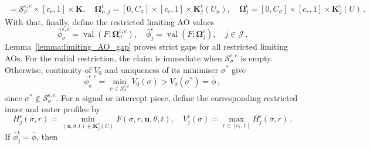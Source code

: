 \documentclass{article}
\theoremstyle{definition}
\newcommand*{\bb}{\boldsymbol}
\def\bu{\bb{u}}
\newcommand{\range}{\operatorname{range}}
\begin{document}
\begin{bibunit}
\begin{equation}
\begin{aligned}
    =
    \mathcal S_{\sigma}^{\epsilon,c}
    \times[c_r,1]\times\bb K,
    \quad 
    \bb\Omega_{n,j}^{\epsilon}
    =
    [0,C_\sigma]\times[c_r,1]\times\bb K_j^\epsilon(U_n),
    \quad 
    \bb\Omega_j^{\epsilon}
    =
    [0,C_\sigma]\times[c_r,1]\times\bb K_j^\epsilon(U) \,.
\end{aligned}
\end{equation}
With that, finally, define the restricted limiting AO values 
\begin{equation}
\label{eq:limiting_restricted_values}
\bar\phi_{\sigma}^{\epsilon,c}
=
\operatorname{val}
\left(
    F;
    \bb\Omega_{\sigma}^{\epsilon,c}
\right),
\quad
\bar\phi_j^\epsilon
=
\operatorname{val}
\left(
    F;
    \bb\Omega_j^\epsilon
\right),
\quad j\in\mathcal J \,.
\end{equation}
Lemma~\ref{lemma:limiting_AO_gap} proves strict gaps for all restricted
limiting AOs. For the radial restriction, the claim is immediate when
$\mathcal S_{\sigma}^{\epsilon,c}$ is empty. Otherwise, continuity of
$V_0$ and uniqueness of its minimiser $\sigma^*$ give
$$
    \bar\phi_{\sigma}^{\epsilon,c}
    =
    \underset{\sigma\in\mathcal S_{\sigma}^{\epsilon,c}}{\min}
    V_0(\sigma)
    >
    V_0(\sigma^*)
    =
    \bar\phi\,,
$$
since $\sigma^*\notin\mathcal S_{\sigma}^{\epsilon,c}$. 
For a signal or intercept piece, define the corresponding restricted inner
and outer profiles by
$$
    H_j^\epsilon(\sigma,r)
    =
    \underset{(\bu,\theta,t)\in\bb K_j^\epsilon(U)}{\min}
    F(\sigma,r,\bu,\theta,t),
    \quad
    V_j^\epsilon(\sigma)
    =
    \underset{r\in[c_r,1]}{\max}
    H_j^\epsilon(\sigma,r) \,.
$$
If $\bar\phi_j^\epsilon=\bar\phi$, then

\end{bibunit}
\end{document}
